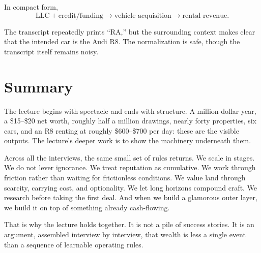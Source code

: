 In compact form,
\begin{equation}
\text{LLC} + \text{credit/funding}
\to
\text{vehicle acquisition}
\to
\text{rental revenue}.
\end{equation}

\begin{remark}
The transcript repeatedly prints ``RA,'' but the surrounding context makes clear that the intended car is the Audi R8. The normalization is safe, though the transcript itself remains noisy.
\end{remark}

\section{Summary}

The lecture begins with spectacle and ends with structure. A million-dollar year, a \$15--\$20 net worth, roughly half a million drawings, nearly forty properties, six cars, and an R8 renting at roughly \$600--\$700 per day: these are the visible outputs. The lecture's deeper work is to show the machinery underneath them.

Across all the interviews, the same small set of rules returns. We scale in stages. We do not lever ignorance. We treat reputation as cumulative. We work through friction rather than waiting for frictionless conditions. We value land through scarcity, carrying cost, and optionality. We let long horizons compound craft. We research before taking the first deal. And when we build a glamorous outer layer, we build it on top of something already cash-flowing.

That is why the lecture holds together. It is not a pile of success stories. It is an argument, assembled interview by interview, that wealth is less a single event than a sequence of learnable operating rules.